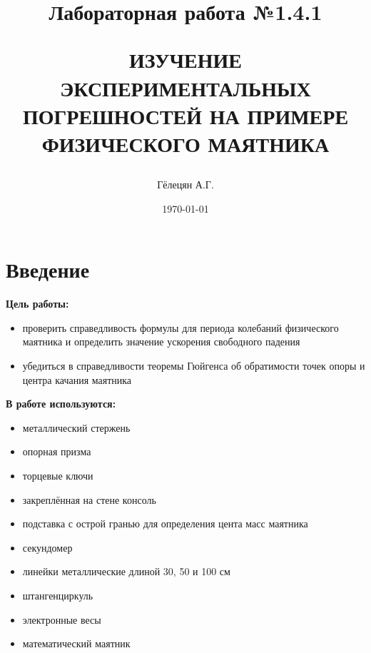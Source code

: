 \documentclass[a4paper, 12pt]{article}
\title{\begin{center}Лабораторная работа №1.4.1\end{center}
ИЗУЧЕНИЕ ЭКСПЕРИМЕНТАЛЬНЫХ ПОГРЕШНОСТЕЙ НА ПРИМЕРЕ ФИЗИЧЕСКОГО МАЯТНИКА}
\author{Гёлецян А.Г.}
\date{\today}
\begin{document}
    \maketitle
    \newpage

    \section{Введение}
    \textbf{Цель работы:}
    \begin{itemize}
     \item проверить справедливость формулы для периода колебаний физического маятника и определить значение ускорения свободного падения
     \item убедиться в справедливости теоремы Гюйгенса об обратимости
    точек опоры и центра качания маятника
    \end{itemize}

    \vspace{1cm}

    \textbf{В работе используются: }
    \begin{itemize}
        \item металлический стержень
        \item опорная призма
        \item торцевые ключи
        \item закреплённая на стене консоль
        \item подставка с острой гранью для определения цента масс маятника
        \item секундомер
        \item линейки металлические длиной 30, 50 и 100 см
        \item штангенциркуль
        \item электронные весы
        \item математический маятник
    \end{itemize}

    \newpage

\end{document}
